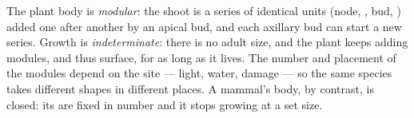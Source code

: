 \begin{proposition}\label{prop:b1:flowering-plant-organization:modular}
The plant body is \emph{modular}: the shoot is a
series of identical units (node, , bud, ) added one after
another by an apical bud, and each axillary bud can start a new series.
Growth is \emph{indeterminate}: there is no
adult size, and the plant keeps adding modules, and thus surface, for as
long as it lives. The number and placement of the modules depend on the
site --- light, water, damage --- so the same species takes different
shapes in different places. A mammal's body, by contrast, is closed:
its  are fixed in number and it stops growing at a set size.
\end{proposition}

